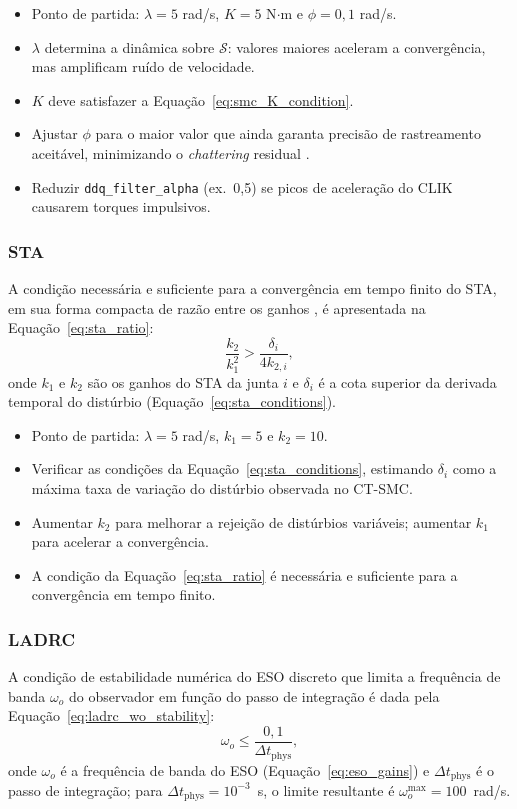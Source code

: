 \begin{itemize}
    \item Ponto de partida: $\lambda = 5$ rad/s, $K = 5$ N$\cdot$m e $\phi = 0,1$ rad/s.
    \item $\lambda$ determina a dinâmica sobre $\mathcal{S}$: valores maiores aceleram a convergência, mas amplificam ruído de velocidade.
    \item $K$ deve satisfazer a Equação~\eqref{eq:smc_K_condition}.
    \item Ajustar $\phi$ para o maior valor que ainda garanta precisão de rastreamento aceitável, minimizando o \textit{chattering} residual \cite{burton1986continuous}.
    \item Reduzir \texttt{ddq\_filter\_alpha} (ex.\ 0,5) se picos de aceleração do CLIK causarem torques impulsivos.
\end{itemize}

\subsubsection*{STA}
A condição necessária e suficiente para a convergência em tempo finito do STA, em sua forma compacta de razão entre os ganhos \cite{moreno2012strict}, é apresentada na Equação~\eqref{eq:sta_ratio}:
\begin{equation}
    \frac{k_2}{k_1^2} > \frac{\delta_i}{4 k_{2,i}},
    \label{eq:sta_ratio}
\end{equation}
onde $k_1$ e $k_2$ são os ganhos do STA da junta $i$ e $\delta_i$ é a cota superior da derivada temporal do distúrbio (Equação~\eqref{eq:sta_conditions}).

\begin{itemize}
    \item Ponto de partida: $\lambda = 5$ rad/s, $k_1 = 5$ e $k_2 = 10$.
    \item Verificar as condições da Equação~\eqref{eq:sta_conditions}, estimando $\delta_i$ como a máxima taxa de variação do distúrbio observada no CT-SMC.
    \item Aumentar $k_2$ para melhorar a rejeição de distúrbios variáveis; aumentar $k_1$ para acelerar a convergência.
    \item A condição da Equação~\eqref{eq:sta_ratio} é necessária e suficiente para a convergência em tempo finito.
\end{itemize}

\subsubsection*{LADRC}
A condição de estabilidade numérica do ESO discreto que limita a frequência de banda $\omega_o$ do observador em função do passo de integração \cite{zheng2010practical} é dada pela Equação~\eqref{eq:ladrc_wo_stability}:
\begin{equation}
    \omega_o \leq \frac{0,1}{\Delta t_{\text{phys}}},
    \label{eq:ladrc_wo_stability}
\end{equation}
onde $\omega_o$ é a frequência de banda do ESO (Equação~\eqref{eq:eso_gains}) e $\Delta t_{\text{phys}}$ é o passo de integração; para $\Delta t_{\text{phys}} = 10^{-3}$~s, o limite resultante é $\omega_o^{\max} = 100$~rad/s.

